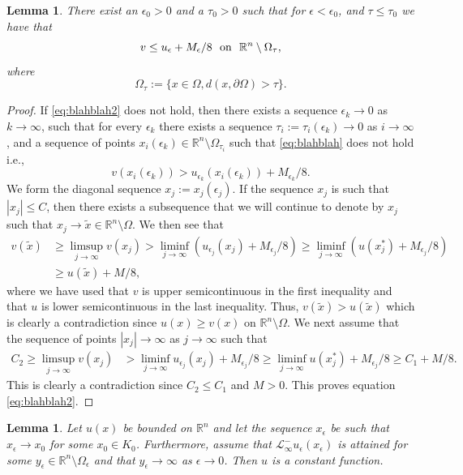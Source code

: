 \documentclass[11pt]{article}
\providecommand{\Lneg}{\mathcal{L}_{\infty}^-}
\providecommand{\Rn}{\mathbb{R}^n}
\newtheorem{lem}[thm]{Lemma}
\numberwithin{equation}{section}
\theoremstyle{definition}
\begin{document}
\begin{lem}\label{lem:A3}
    There exist an $\epsilon_0>0$ and a $\tau_0 >0$ such that for $\epsilon < \epsilon_0$, and $\tau \leq \tau_0$ we have that
\begin{equation}
\label{eq:blahblah2}
v \leq u_{\epsilon} + M_{\epsilon}/8 \ \textup{ on } \ \Rn \setminus \Omega_{\tau},   
\end{equation}
where
$$
\Omega_{\tau}:= \{ x \in \Omega, d(x, \partial \Omega)> \tau \}. 
$$
\end{lem}
\begin{proof}
    If \eqref{eq:blahblah2} does not hold, then there exists a sequence $\epsilon_k \to 0$ as $k \to \infty$, such that for every $\epsilon_k$ there exists a sequence $\tau_i:=\tau_i(\epsilon_k) \to 0 $ as $i \to \infty$, and a sequence of points $x_i(\epsilon_k) \in \Rn \setminus \Omega_{\tau_i}$ such that \eqref{eq:blahblah} does not hold i.e., 
$$
v(x_i(\epsilon_k)) > u_{\epsilon_k}(x_i(\epsilon_k)) + M_{\epsilon_k}/8.
$$
We form the diagonal sequence $x_j:=x_j(\epsilon_j)$. If the sequence $x_j$ is such that $|x_j| \leq C$, then there exists a subsequence that we will continue to denote by $x_j$ such that $x_j \to \tilde{x} \in \Rn \setminus \Omega$. We then see that
\begin{align*}
    v(\tilde{x}) & \geq \limsup_{j\to \infty} v(x_j) > \liminf_{j \to \infty} (u_{\epsilon_j}(x_j) + M_{\epsilon_j}/8) \geq \liminf_{j \to \infty} (u(x_j^*) + M_{\epsilon_j}/8) \\
    &\geq u(\tilde{x}) + M/8,
\end{align*}
where we have used that $v$ is upper semicontinuous in the first inequality and that $u$ is lower semicontinuous in the last inequality. Thus, $v(\tilde{x}) > u(\tilde{x})$ which is clearly a contradiction since $u(x) \geq v(x)$ on $\Rn \setminus \Omega$. We next assume that the sequence of points $|x_j| \to \infty$ as $j \to \infty$ such that
\begin{align*}
C_2 \geq \limsup_{j\to \infty} v(x_j) & > \liminf_{j \to \infty} u_{\epsilon_j}(x_j) + M_{\epsilon_j}/8 \geq \liminf_{j \to \infty} u(x_j^*) + M_{\epsilon_j}/8 \geq C_1 +M/8.
\end{align*}
This is clearly a contradiction since $C_2 \leq C_1$ and $M>0$. This proves equation \eqref{eq:blahblah2}. 
\end{proof}

\begin{lem}\label{lem:A4}
    Let $u(x)$ be bounded on $ \Rn$ and let the sequence $x_{\epsilon} $ be such that $x_{\epsilon} \rightarrow x_0$ for some $x_0 \in K_0$. Furthermore, assume that $\Lneg u_{\epsilon}(x_{\epsilon})$ is attained for some $y_{\epsilon} \in \Rn \setminus \Omega_{\epsilon}$ and that $y_{\epsilon} \to \infty$ as $\epsilon \to 0$. Then $u$ is a constant function.
\end{lem}
\end{document}

